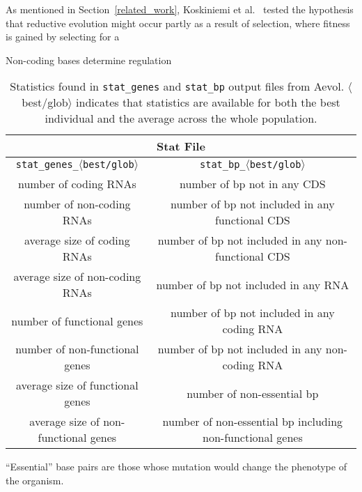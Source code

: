 As mentioned in Section~\ref{related_work}, Koskiniemi et al.~\cite{koskiniemi2012} tested the hypothesis that reductive evolution might occur partly as a result of selection, where fitness is gained by selecting for a 

Non-coding bases determine regulation %
	

\begin{table}[H]
	\centering
	\begin{tabular}{ |c|c| }
		\hline
		\multicolumn{2}{|c|}{\textbf{Stat File}} \\
		\hline
		\texttt{stat\_genes\_}$\langle$\texttt{best/glob}$\rangle$ & \texttt{stat\_bp\_}$\langle$\texttt{best/glob}$\rangle$ \\
		\hline \hline
		number of coding RNAs & number of bp not in any CDS \\
		\hline
		number of non-coding RNAs & number of bp not included in any functional CDS \\
		\hline
		average size of coding RNAs & number of bp not included in any non-functional CDS \\
		\hline
		average size of non-coding RNAs & number of bp not included in any RNA \\
		\hline
		number of functional genes & number of bp not included in any coding RNA \\
		\hline
		number of non-functional genes & number of bp not included in any non-coding RNA \\
		\hline
		average size of functional genes & number of non-essential bp \\
		\hline
		average size of non-functional genes & number of non-essential bp including non-functional genes \\
		\hline
	\end{tabular}
	\caption[Aevol's stats: genes and base pairs]{Statistics found in \texttt{stat\_genes} and \texttt{stat\_bp} output files from Aevol. $\langle$best/glob$\rangle$ indicates that statistics are available for both the best individual and the average across the whole population.}
	\label{table:aevol_stats_genes_and_bp}
\end{table}
``Essential'' base pairs are those whose mutation would change the phenotype of the organism.
